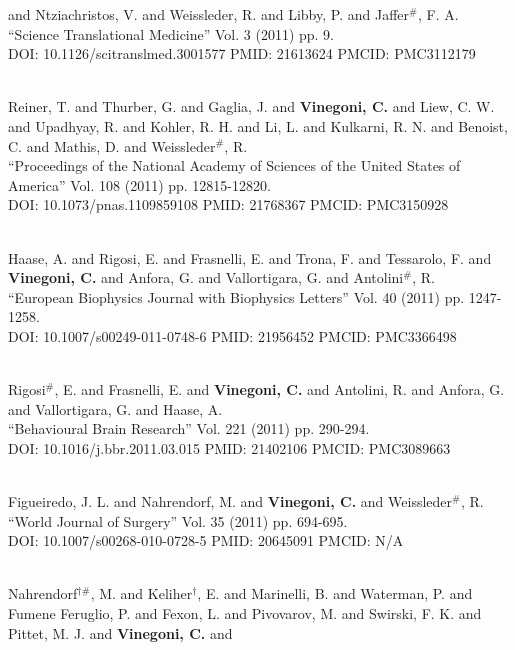 and Ntziachristos, V. and Weissleder, R. and Libby, P. and Jaffer$^\#$, F. A. \\ ``Science Translational Medicine'' Vol. 3 (2011) pp. 9. \\ DOI: 10.1126/scitranslmed.3001577 PMID: 21613624 PMCID: PMC3112179\item {} \\ Reiner, T. and Thurber, G. and Gaglia, J. and {\bf Vinegoni, C.} and Liew, C. W. and Upadhyay, R. and Kohler, R. H. and Li, L. and Kulkarni, R. N. and Benoist, C. and Mathis, D. and Weissleder$^\#$, R. \\ ``Proceedings of the National Academy of Sciences of the United States of America'' Vol. 108 (2011) pp. 12815-12820. \\ DOI: 10.1073/pnas.1109859108 PMID: 21768367 PMCID: PMC3150928\item {} \\ Haase, A. and Rigosi, E. and Frasnelli, E. and Trona, F. and Tessarolo, F. and {\bf Vinegoni, C.} and Anfora, G. and Vallortigara, G. and Antolini$^\#$, R. \\ ``European Biophysics Journal with Biophysics Letters'' Vol. 40 (2011) pp. 1247-1258. \\ DOI: 10.1007/s00249-011-0748-6 PMID: 21956452 PMCID: PMC3366498\item {} \\ Rigosi$^\#$, E. and Frasnelli, E. and {\bf Vinegoni, C.} and Antolini, R. and Anfora, G. and Vallortigara, G. and Haase, A. \\ ``Behavioural Brain Research'' Vol. 221 (2011) pp. 290-294. \\ DOI: 10.1016/j.bbr.2011.03.015 PMID: 21402106 PMCID: PMC3089663\item {} \\ Figueiredo, J. L. and Nahrendorf, M. and {\bf Vinegoni, C.} and Weissleder$^\#$, R. \\ ``World Journal of Surgery'' Vol. 35 (2011) pp. 694-695. \\ DOI: 10.1007/s00268-010-0728-5 PMID: 20645091 PMCID: N/A\item {} \\ Nahrendorf$^{\dag \#}$, M. and Keliher$^\dag$, E. and Marinelli, B. and Waterman, P. and Fumene Feruglio, P. and Fexon, L. and Pivovarov, M. and Swirski, F. K. and Pittet, M. J. and {\bf Vinegoni, C.} and 